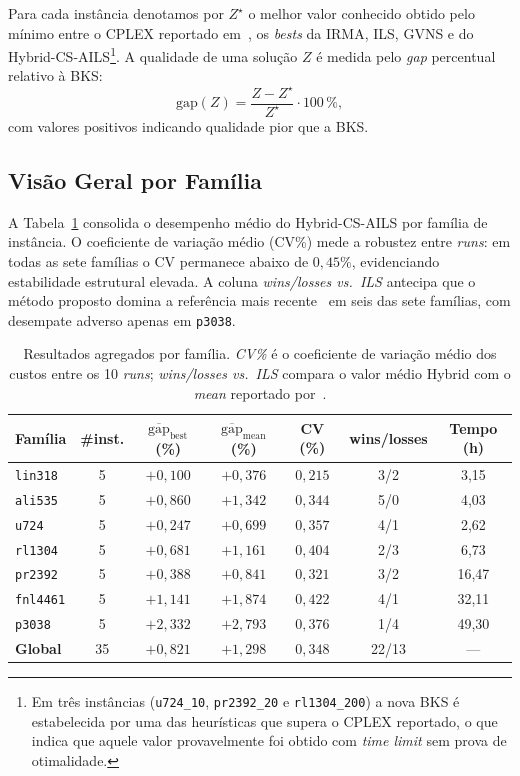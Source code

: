 Para cada instância denotamos por $Z^{\star}$ o melhor valor conhecido
obtido pelo mínimo entre o \textsc{CPLEX} reportado em~\cite{Stefanello2015},
os \emph{bests} da IRMA, ILS, GVNS e do Hybrid-CS-AILS\footnote{Em três
instâncias (\texttt{u724\_10}, \texttt{pr2392\_20} e
\texttt{rl1304\_200}) a nova BKS é estabelecida por uma das heurísticas
que supera o \textsc{CPLEX} reportado, o que indica que aquele valor
provavelmente foi obtido com \emph{time limit} sem prova de otimalidade.}.
A qualidade de uma solução $Z$ é medida pelo \emph{gap}
percentual relativo à BKS:
\begin{equation}
  \mathrm{gap}(Z) = \frac{Z - Z^{\star}}{Z^{\star}} \cdot 100\,\%,
  \label{eq:gap}
\end{equation}
com valores positivos indicando qualidade pior que a BKS.

\subsection{Visão Geral por Família}
\label{sec:results:overview}

A Tabela~\ref{tab:family} consolida o desempenho médio do Hybrid-CS-AILS
por família de instância. O coeficiente de variação médio (CV\%) mede a
robustez entre \emph{runs}: em todas as sete famílias o CV permanece
abaixo de $0{,}45\%$, evidenciando estabilidade estrutural elevada.
A coluna \emph{wins/losses vs.\ ILS} antecipa que o método proposto
domina a referência mais recente~\cite{Freitas2025} em seis das sete
famílias, com desempate adverso apenas em \texttt{p3038}.

\begin{table}[!htb]
\centering
\caption{Resultados agregados por família. \emph{CV\%} é o coeficiente de
variação médio dos custos entre os 10 \emph{runs}; \emph{wins/losses
vs.\ ILS} compara o valor médio Hybrid com o \emph{mean} reportado
por~\cite{Freitas2025}.}
\label{tab:family}
\small
\begin{tabular}{lcccccc}
\hline
Família & \#inst. & $\overline{\mathrm{gap}}_{\mathrm{best}}$ (\%)
        & $\overline{\mathrm{gap}}_{\mathrm{mean}}$ (\%)
        & CV (\%) & wins/losses & Tempo (h) \\
\hline
\texttt{lin318}  & 5 & $+0{,}100$ & $+0{,}376$ & $0{,}215$ & 3/2 &  3{,}15 \\
\texttt{ali535}  & 5 & $+0{,}860$ & $+1{,}342$ & $0{,}344$ & 5/0 &  4{,}03 \\
\texttt{u724}    & 5 & $+0{,}247$ & $+0{,}699$ & $0{,}357$ & 4/1 &  2{,}62 \\
\texttt{rl1304}  & 5 & $+0{,}681$ & $+1{,}161$ & $0{,}404$ & 2/3 &  6{,}73 \\
\texttt{pr2392}  & 5 & $+0{,}388$ & $+0{,}841$ & $0{,}321$ & 3/2 & 16{,}47 \\
\texttt{fnl4461} & 5 & $+1{,}141$ & $+1{,}874$ & $0{,}422$ & 4/1 & 32{,}11 \\
\texttt{p3038}   & 5 & $+2{,}332$ & $+2{,}793$ & $0{,}376$ & 1/4 & 49{,}30 \\
\hline
\textbf{Global}  & 35 & $+0{,}821$ & $+1{,}298$ & $0{,}348$ & 22/13 & --- \\
\hline
\end{tabular}
\end{table}

